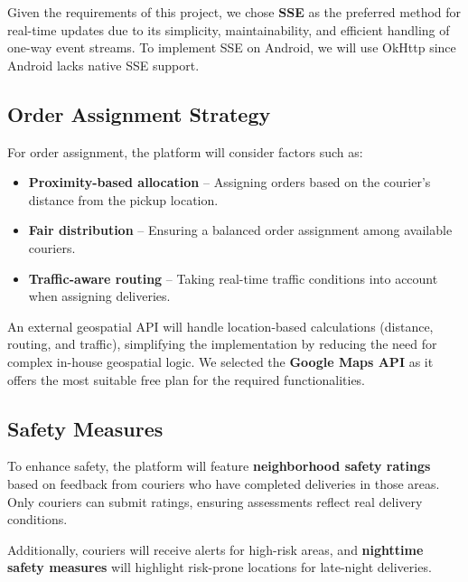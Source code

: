 \documentclass[a4paper,twoside,11pt]{article}
\begin{document}
Given the requirements of this project, we chose \textbf{SSE} as the preferred method for real-time updates due to its simplicity, maintainability, and efficient handling of one-way event streams. To implement SSE on Android, we will use OkHttp since Android lacks native SSE support.

\subsection{Order Assignment Strategy}  

For order assignment, the platform will consider factors such as:

\begin{itemize}
    \item \textbf{Proximity-based allocation} – Assigning orders based on the courier’s distance from the pickup location.
    \item \textbf{Fair distribution} – Ensuring a balanced order assignment among available couriers.
    \item \textbf{Traffic-aware routing} – Taking real-time traffic conditions into account when assigning deliveries.
\end{itemize}

An external geospatial API will handle location-based calculations (distance, routing, and traffic), simplifying the implementation by reducing the need for complex in-house geospatial logic. We selected the \textbf{Google Maps API} as it offers the most suitable free plan for the required functionalities.

\subsection{Safety Measures}  

To enhance safety, the platform will feature \textbf{neighborhood safety ratings} based on feedback from couriers who have completed deliveries in those areas. Only couriers can submit ratings, ensuring assessments reflect real delivery conditions.  

Additionally, couriers will receive alerts for high-risk areas, and \textbf{nighttime safety measures} will highlight risk-prone locations for late-night deliveries.


\newpage 
\end{document}
